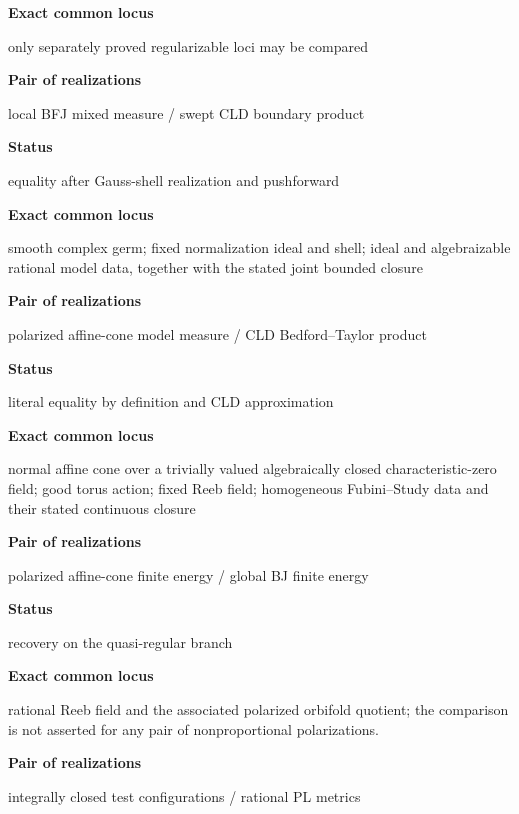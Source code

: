 \textbf{Exact common locus}\par\nopagebreak
only separately proved regularizable loci may be compared

\medskip
\textbf{Pair of realizations}\par\nopagebreak
local BFJ mixed measure / swept CLD boundary product\par\nopagebreak

\textbf{Status}\par\nopagebreak
equality after Gauss-shell realization and pushforward\par\nopagebreak

\textbf{Exact common locus}\par\nopagebreak
smooth complex germ; fixed normalization ideal and shell; ideal and
algebraizable rational model data, together with the stated joint bounded
closure

\medskip
\textbf{Pair of realizations}\par\nopagebreak
polarized affine-cone model measure / CLD Bedford--Taylor product\par\nopagebreak

\textbf{Status}\par\nopagebreak
literal equality by definition and CLD approximation\par\nopagebreak

\textbf{Exact common locus}\par\nopagebreak
normal affine cone over a trivially valued algebraically closed
characteristic-zero field; good torus action; fixed Reeb field; homogeneous
Fubini--Study data and their stated continuous closure

\medskip
\textbf{Pair of realizations}\par\nopagebreak
polarized affine-cone finite energy / global BJ finite energy\par\nopagebreak

\textbf{Status}\par\nopagebreak
recovery on the quasi-regular branch\par\nopagebreak

\textbf{Exact common locus}\par\nopagebreak
rational Reeb field and the associated polarized orbifold quotient; the
comparison is not asserted for any pair of nonproportional polarizations.

\medskip
\textbf{Pair of realizations}\par\nopagebreak
integrally closed test configurations / rational PL metrics\par\nopagebreak

